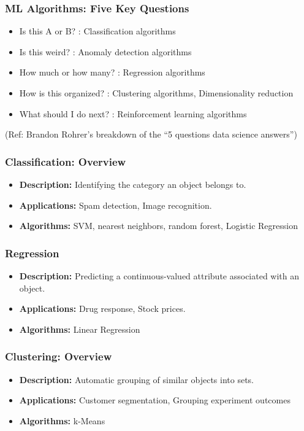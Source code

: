 \begin{frame}[fragile]\frametitle{ML Algorithms: Five Key Questions}

\begin{itemize}
\item Is this A or B? : Classification algorithms
\item Is this weird? : Anomaly detection algorithms
\item How much or how many? : Regression algorithms
\item How is this organized? : Clustering algorithms, Dimensionality reduction
\item What should I do next? : Reinforcement learning algorithms
\end{itemize}

\tiny{(Ref: Brandon Rohrer's breakdown of the ``5 questions data science answers'')}

\end{frame}

\begin{frame}[fragile]\frametitle{Classification: Overview}
\begin{itemize}
\item \textbf{Description:} Identifying the category an object belongs to.
\item \textbf{Applications:} Spam detection, Image recognition.
\item \textbf{Algorithms:} SVM, nearest neighbors, random forest, Logistic Regression
\end{itemize}
\end{frame}


\begin{frame}[fragile]\frametitle{Regression}
\begin{itemize}
\item \textbf{Description:} Predicting a continuous-valued attribute associated with an object.
\item \textbf{Applications:} Drug response, Stock prices.
\item \textbf{Algorithms:} Linear Regression 
\end{itemize}
\end{frame}

\begin{frame}[fragile]\frametitle{Clustering: Overview}
\begin{itemize}
\item \textbf{Description:} Automatic grouping of similar objects into sets.
\item \textbf{Applications:} Customer segmentation, Grouping experiment outcomes
\item \textbf{Algorithms:} k-Means
\end{itemize}
\end{frame}

